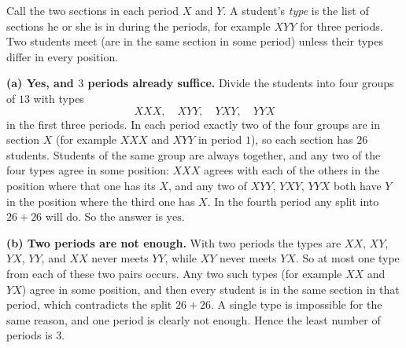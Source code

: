 Call the two sections in each period $X$ and $Y$. A student's \emph{type} is the list of sections he or she is in during the periods, for example $XYY$ for three periods. Two students meet (are in the same section in some period) unless their types differ in every position.

\textbf{(a) Yes, and $3$ periods already suffice.} Divide the students into four groups of $13$ with types
\[XXX,\quad XYY,\quad YXY,\quad YYX\]
in the first three periods. In each period exactly two of the four groups are in section $X$ (for example $XXX$ and $XYY$ in period $1$), so each section has $26$ students. Students of the same group are always together, and any two of the four types agree in some position: $XXX$ agrees with each of the others in the position where that one has its $X$, and any two of $XYY$, $YXY$, $YYX$ both have $Y$ in the position where the third one has $X$. In the fourth period any split into $26+26$ will do. So the answer is $\boxed{\text{yes}}$.

\textbf{(b) Two periods are not enough.} With two periods the types are $XX$, $XY$, $YX$, $YY$, and $XX$ never meets $YY$, while $XY$ never meets $YX$. So at most one type from each of these two pairs occurs. Any two such types (for example $XX$ and $YX$) agree in some position, and then every student is in the same section in that period, which contradicts the split $26+26$. A single type is impossible for the same reason, and one period is clearly not enough. Hence the least number of periods is $\boxed{3}$.
